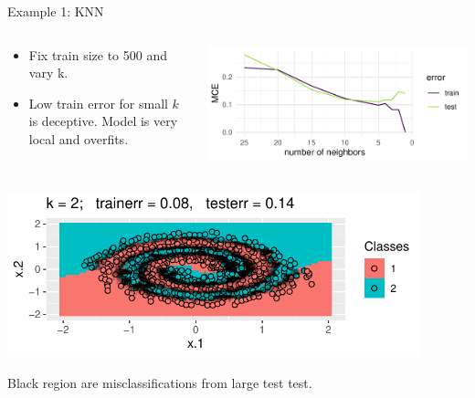 \begin{vbframe}{Example 1: KNN}
\framebreak


\small






\begin{columns}
\begin{column}{0.6\textwidth}
\begin{itemize}
\item Fix train size to 500 and vary k.
\item Low train error for small $k$ is deceptive. Model is very local and overfits.
\end{itemize}
\end{column}
\begin{column}{0.4\textwidth}
\begin{center}
\includegraphics[width = \textwidth]{figure/eval_delta_train_test_overfit}
\end{center}
\end{column}
\end{columns}
\vfill
\begin{center}
\includegraphics[width = 0.90\textwidth]{figure/eval_delta_train_test_knn_2d}
\end{center}
Black region are misclassifications from large test test.
\end{vbframe}


